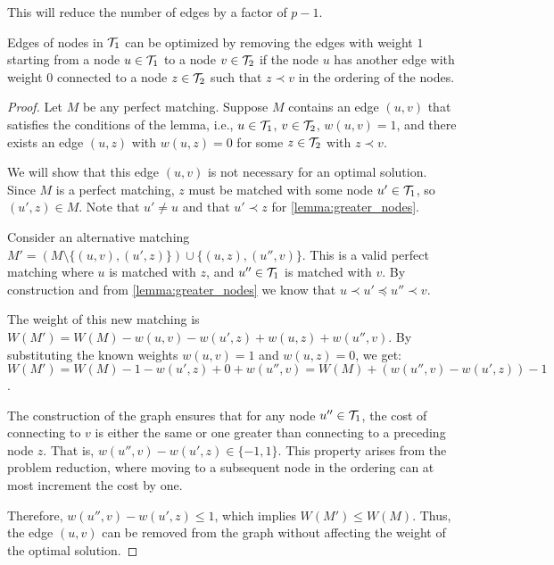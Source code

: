This will reduce the number of edges by a factor of $p-1$.

\begin{lemma} \label{lemma:tree_optimization_2}
    Edges of nodes in $\mathcal{T}_{1}$ can be optimized by removing the edges with weight $1$ starting from a node $u \in \mathcal{T}_{1}$ to a node $v \in \mathcal{T}_{2}$ if the node $u$ has another edge with weight $0$ connected to a node $z \in \mathcal{T}_{2}$ such that $z \prec v$ in the ordering of the nodes.
\end{lemma}

\begin{proof}
    Let $M$ be any perfect matching. Suppose $M$ contains an edge $(u, v)$ that satisfies the conditions of the lemma, i.e., $u \in \mathcal{T}_{1}$, $v \in \mathcal{T}_{2}$, $w(u,v) = 1$, and there exists an edge $(u, z)$ with $w(u,z) = 0$ for some $z \in \mathcal{T}_{2}$ with $z \prec v$.

    We will show that this edge $(u,v)$ is not necessary for an optimal solution. Since $M$ is a perfect matching, $z$ must be matched with some node $u' \in \mathcal{T}_{1}$, so $(u',z) \in M$. Note that $u' \neq u$ and that $u' \prec z$ for \cref{lemma:greater_nodes}.

    Consider an alternative matching $M' = (M \setminus \{(u,v), (u',z)\}) \cup \{(u,z), (u'',v)\}$. This is a valid perfect matching where $u$ is matched with $z$, and $u'' \in \mathcal{T}_{1}$ is matched with $v$. By construction and from \cref{lemma:greater_nodes} we know that $u \prec u' \preceq u'' \prec v$.
    
    The weight of this new matching is $W(M') = W(M) - w(u,v) - w(u',z) + w(u,z) + w(u'',v)$.
    By substituting the known weights $w(u,v)=1$ and $w(u,z)=0$, we get:
    $W(M') = W(M) - 1 - w(u',z) + 0 + w(u'',v) = W(M) + (w(u'',v) - w(u',z)) - 1$.

    The construction of the graph ensures that for any node $u'' \in \mathcal{T}_{1}$, the cost of connecting to $v$ is either the same or one greater than connecting to a preceding node $z$. That is, $w(u'',v) - w(u',z) \in \{-1, 1\}$. This property arises from the problem reduction, where moving to a subsequent node in the ordering can at most increment the cost by one.
    
    Therefore, $w(u'',v) - w(u',z) \le 1$, which implies $W(M') \leq W(M)$. Thus, the edge $(u,v)$ can be removed from the graph without affecting the weight of the optimal solution.


\end{proof}
